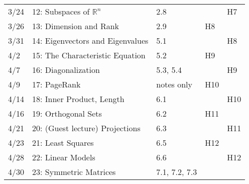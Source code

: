 \documentclass[11pt]{article}
\begin{document}
\begin{centering}
\begin{tabular}{||l|p{3in}|l|l|l||}
3/24 & 12: Subspaces of $\mathbb{R}^n$ & 2.8 & & H7\\ 
3/26 & 13: Dimension and Rank & 2.9 & H8 &\\ 
\hline

3/31 & 14: Eigenvectors and Eigenvalues & 5.1 &  & H8\\ 
4/2 & 15: The Characteristic Equation & 5.2 & H9 &\\ 
\hline

4/7 & 16: Diagonalization & 5.3, 5.4 & & H9\\ 
4/9 & 17: PageRank & notes only & H10 &\\  %
\hline

4/14 & 18: Inner Product, Length & 6.1 & & H10\\
4/16 & 19: Orthogonal Sets & 6.2 & H11 &\\ 
 \hline

4/21 & 20: (Guest lecture) Projections & 6.3 & & H11\\ 
4/23 & 21:  Least Squares & 6.5 & H12 & \\
\hline

4/28 & 22: Linear Models & 6.6 & & H12\\ 
4/30 & 23: Symmetric Matrices & 7.1, 7.2, 7.3 &  &\\ 
\hline\hline


\end{tabular}\\
\end{centering}
\end{document}
